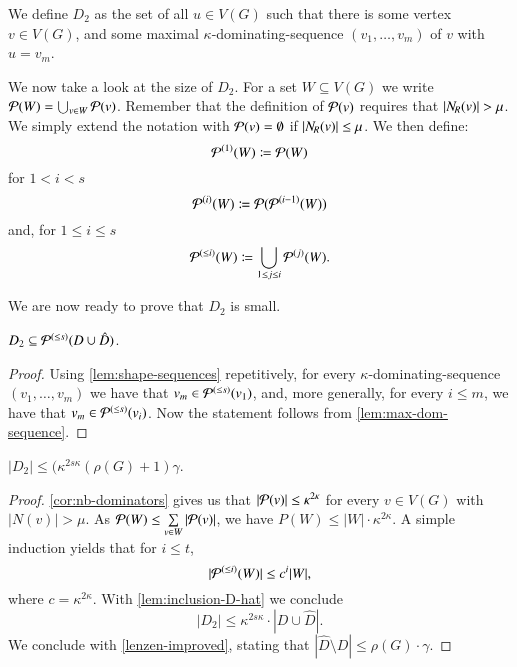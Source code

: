 \begin{tcolorbox}[colback=red!5!white,colframe=red!50!black]
  We define $D_2$ as the set of all $u\in V(G)$ such that there is some vertex
  $v\in V(G)$, and some maximal $\kappa$-dominating-sequence $(v_1,\ldots,v_m)$ of
  $v$ with $u=v_m$.
\end{tcolorbox}

We now take a look at the size of $D_2$.
For a set $W\subseteq V(G)$ we write $\mathcal{P}(W) = \bigcup_{v\in W}\mathcal{P}(v)$.
Remember that the definition of $\mathcal{P}(v)$ requires that $|\Nr(v)|>\mu$. We simply
extend the notation with $\mathcal{P}(v)=\emptyset$ if $|N_{\hspace{-1pt}R}(v)|\le \mu$.
We then define:
\[\mathcal{P}^{(1)}(W)\coloneqq \mathcal{P}(W)\]
for $1<i <s$
\[\mathcal{P}^{(i)}(W)\coloneqq \mathcal{P}(\mathcal{P}^{(i-1)}(W))\]
and, for $1\le i \le s$
\[\mathcal{P}^{(\leq i)}(W)\coloneqq \bigcup_{1\leq j\leq i}\mathcal{P}^{(j)}(W).\]



We are now ready to prove that $D_2$ is small.

\begin{lemma}\label{lem:inclusion-D-hat}
  $D_2 \subseteq \mathcal{P}^{(\le s)}(D\cup\hat{D})$.
\end{lemma}
\begin{proof}
  Using \cref{lem:shape-sequences} repetitively, for every
  $\kappa$-dominating-sequence $(v_1,\ldots,v_m)$ we have that\linebreak
  $v_m \in \mathcal{P}^{(\le s)}(v_1)$, and, more generally, for every $i\le m$, we have that
  $v_m\in \mathcal{P}^{(\le s)}(v_i)$. Now the statement follows from \cref{lem:max-dom-sequence}.
\end{proof}

\begin{lemma}\label{lem:small-D-hat}
  $|D_2| \le (\kappa^{2s\kappa}(\rho(G)+1)\gamma$.
\end{lemma}
\begin{proof}
  \cref{cor:nb-dominators} gives us that $|\mathcal{P}(v)|\le \kappa^{2\kappa}$ for every
  $v\in V(G)$ with $|N(v)|> \mu$.
  As $\mathcal{P}(W) \le \sum\limits_{v\in W} |\mathcal{P}(v)|$,
  we have $P(W)\le |W|\cdot \kappa^{2\kappa}$.
  A simple induction yields that for $i\le t$,
  \[ |\mathcal{P}^{(\le i)}(W)|\leq c^i|W|, \] where $c=\kappa^{2\kappa}$.
  With \cref{lem:inclusion-D-hat} we conclude
  \[|D_2| \le \kappa^{2s\kappa} \cdot|D\cup\hat{D}|.\]
  We conclude with \cref{lenzen-improved}, stating that
  $|\hat{D}\setminus D|\leq \rho(G)\cdot \gamma$.
\end{proof}

